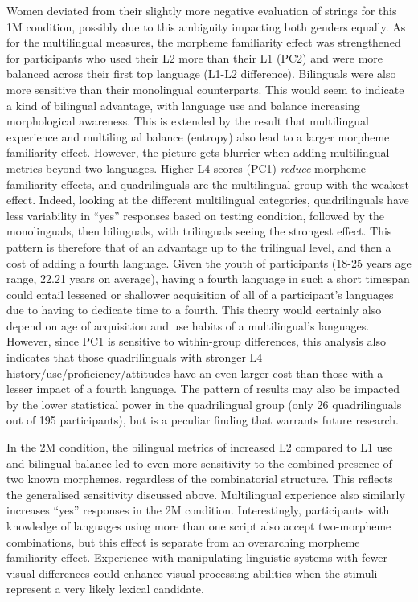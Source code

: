 Women deviated from their slightly more negative evaluation of strings for this 1M condition, possibly due to this ambiguity impacting both genders equally. As for the multilingual measures, the morpheme familiarity effect was strengthened for participants who used their L2 more than their L1 (PC2) and were more balanced across their first top language (L1-L2 difference). Bilinguals were also more sensitive than their monolingual counterparts. This would seem to indicate a kind of bilingual advantage, with language use and balance increasing morphological awareness. This is extended by the result that multilingual experience and multilingual balance (entropy) also lead to a larger morpheme familiarity effect. However, the picture gets blurrier when adding multilingual metrics beyond two languages. Higher L4 scores (PC1) \emph{reduce} morpheme familiarity effects, and quadrilinguals are the multilingual group with the weakest effect. Indeed, looking at the different multilingual categories, quadrilinguals have less variability in ``yes'' responses based on testing condition, followed by the monolinguals, then bilinguals, with trilinguals seeing the strongest effect. This pattern is therefore that of an advantage up to the trilingual level, and then a cost of adding a fourth language. Given the youth of participants (18-25 years age range, 22.21 years on average), having a fourth language in such a short timespan could entail lessened or shallower acquisition of all of a participant's languages due to having to dedicate time to a fourth. This theory would certainly also depend on age of acquisition and use habits of a multilingual's languages. However, since PC1 is sensitive to within-group differences, this analysis also indicates that those quadrilinguals with stronger L4 history/use/proficiency/attitudes have an even larger cost than those with a lesser impact of a fourth language. The pattern of results may also be impacted by the lower statistical power in the quadrilingual group (only 26 quadrilinguals out of 195 participants), but is a peculiar finding that warrants future research.

In the 2M condition, the bilingual metrics of increased L2 compared to L1 use and bilingual balance led to even more sensitivity to the combined presence of two known morphemes, regardless of the combinatorial structure. This reflects the generalised sensitivity discussed above. Multilingual experience also similarly increases ``yes'' responses in the 2M condition. Interestingly, participants with knowledge of languages using more than one script also accept two-morpheme combinations, but this effect is separate from an overarching morpheme familiarity effect. Experience with manipulating linguistic systems with fewer visual differences could enhance visual processing abilities when the stimuli represent a very likely lexical candidate. 

